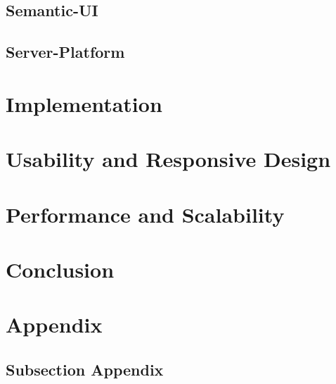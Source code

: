 \section{Semantic-UI}
\section{Server-Platform}

\chapter{Implementation}

\chapter{Usability and Responsive Design}

\chapter{Performance and Scalability}

\chapter{Conclusion}

\cleardoublepage
\appendixheader

\setcounter{section}{0}
\setcounter{chapter}{0}
\renewcommand{\thesection}{A.\arabic{section}}
\renewcommand{\thechapter}{A}



\chapter*{Appendix}  %
\setcounter{section}{0}
\setcounter{chapter}{0}
\renewcommand{\thesection}{A.\arabic{section}}
\renewcommand{\thechapter}{A}  


\section{Subsection Appendix}

\cleardoublepage
\nocite{*}



